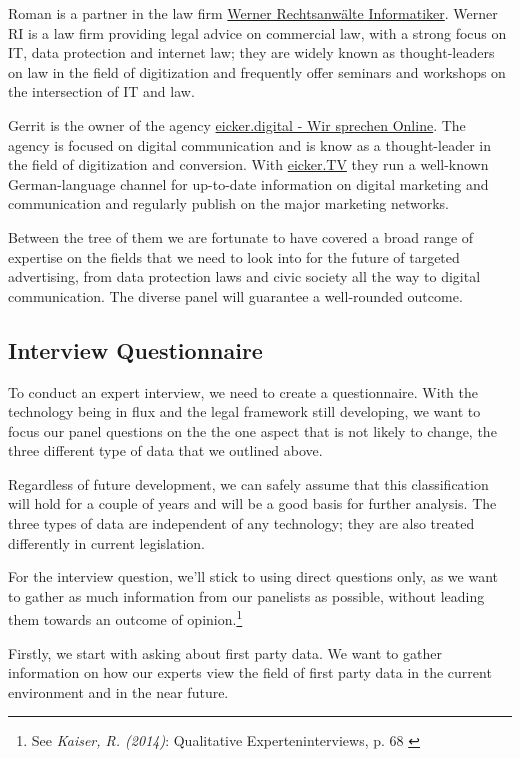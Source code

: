 Roman is a partner in the law firm \href{https://www.werner-ri.de/}{Werner Rechtsanwälte Informatiker}. Werner RI is a law firm providing legal advice on commercial law, with a strong focus on IT, data protection and internet law; they are widely known as thought-leaders on law in the field of digitization and frequently offer seminars and workshops on the intersection of IT and law.

Gerrit is the owner of the agency \href{https://eicker.digital/}{eicker.digital - Wir sprechen Online}. The agency is focused on digital communication and is know as a thought-leader in the field of digitization and conversion. With \href{https://www.youtube.com/eickertv}{eicker.TV} they run a well-known German-language channel for up-to-date information on digital marketing and communication and regularly publish on the major marketing networks.

Between the tree of them we are fortunate to have covered a broad range of expertise on the fields that we need to look into for the future of targeted advertising, from data protection laws and civic society all the way to digital communication. The diverse panel will guarantee a well-rounded outcome.

\subsection{Interview Questionnaire}

To conduct an expert interview, we need to create a questionnaire. With the technology being in flux and the legal framework still developing, we want to focus our panel questions on the the one aspect that is not likely to change, the three different type of data that we outlined above.

Regardless of future development, we can safely assume that this classification will hold for a couple of years and will be a good basis for further analysis. The three types of data are independent of any technology; they are also treated differently in current legislation.

For the interview question, we'll stick to using direct questions only, as we want to gather as much information from our panelists as possible, without leading them towards an outcome of opinion.\footnote{See \textit{Kaiser, R. (2014)}: Qualitative Experteninterviews, p. 68 \cite{expertInterviews}} 

Firstly, we start with asking about first party data. We want to gather information on how our experts view the field of first party data in the current environment and in the near future. 

